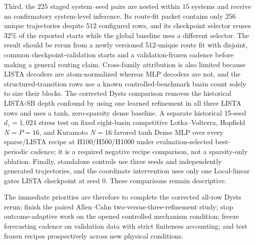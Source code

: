 \documentclass[11pt]{article}
\begin{document}
Third, the \(225\) staged system--seed pairs are nested within \(15\) systems and receive no confirmatory system-level inference. Its route-fit packet contains only \(256\) unique trajectories despite \(512\) configured rows, and its checkpoint selector reuses \(32\%\) of the reported starts while the global baseline uses a different selector. The result should be rerun from a newly versioned 512-unique route fit with disjoint, common checkpoint-validation starts and a validation-frozen cadence before making a general routing claim. Cross-family attribution is also limited because LISTA decoders are atom-normalized whereas MLP decoders are not, and the structured-transition rows use a known controlled-benchmark basin count solely to size their blocks. The corrected Dysts comparison removes the historical LISTA-SB depth confound by using one learned refinement in all three LISTA rows and uses a tanh, zero-sparsity dense baseline. A separate historical 15-seed \(d_z=1{,}024\) stress test on fixed eight-basin competitive Lotka--Volterra, Hopfield \(N=P=16\), and Kuramoto \(N=16\) favored tanh Dense MLP over every sparse/LISTA recipe at H100/H500/H1000 under evaluation-selected best-periodic cadence; it is a required negative recipe comparison, not a sparsity-only ablation. Finally, standalone controls use three seeds and independently generated trajectories, and the coordinate intervention uses only one Local-linear gates LISTA checkpoint at seed \(0\). These comparisons remain descriptive.

The immediate priorities are therefore to complete the corrected all-row Dysts rerun; finish the paired Allen--Cahn two-versus-three-refinement study; stop outcome-adaptive work on the opened controlled mechanism condition; freeze forecasting cadence on validation data with strict finiteness accounting; and test frozen recipes prospectively across new physical conditions.

\appendix















\end{document}
